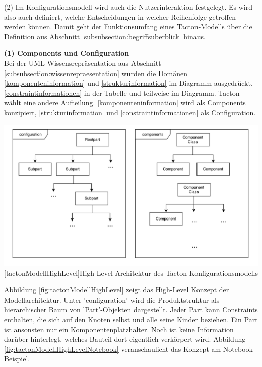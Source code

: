\documentclass[12pt,a4paper,bibliography=totocnumbered,listof=totoc]{scrartcl}
\begin{document}
(2) Im Konfigurationsmodell wird auch die Nutzerinteraktion festgelegt. Es wird also auch definiert, welche Entscheidungen in welcher Reihenfolge getroffen werden können. Damit geht der Funktionsumfang eines Tacton-Modells über die Definition aus Abschnitt \ref{subsubsection:begriffsuberblick} hinaus.

\textbf{(1) Components und Configuration}\\
Bei der UML-Wissensrepräsentation aus Abschnitt \ref{subsubsection:wissenrepraesentation} wurden die Domänen \ref{komponenteninformation} und \ref{strukturinformation} im Diagramm ausgedrückt,  \ref{constraintinformationen} in der Tabelle und teilweise im Diagramm. Tacton wählt eine andere Aufteilung. \ref{komponenteninformation} wird als \glqq Components\grqq{} konzipiert, \ref{strukturinformation} und \ref{constraintinformationen} als \glqq Configuration\grqq{}.

\vspace{1em}
\begin{minipage}{\linewidth}
	\centering
	\includegraphics[width=1\linewidth]{Abbildungen/tactonModellHighLevel.pdf}
	[tactonModellHighLevel]{High-Level Architektur des Tacton-Konfigurationsmodells}
	\label{fig:tactonModellHighLevel}
\end{minipage}
\vspace{1em}

Abbildung \ref{fig:tactonModellHighLevel} zeigt das High-Level Konzept der Modellarchitektur. Unter 'configuration' wird die Produktstruktur als hierarchischer Baum  von 'Part'-Objekten dargestellt. Jeder Part kann Constraints enthalten, die sich auf den Knoten selbst und alle seine Kinder beziehen. Ein Part ist ansonsten nur ein Komponentenplatzhalter. Noch ist keine Information darüber hinterlegt, welches Bauteil dort eigentlich verkörpert wird. Abbildung \ref{fig:tactonModellHighLevelNotebook} veranschaulicht das Konzept am Notebook-Beispiel.
\end{document}
